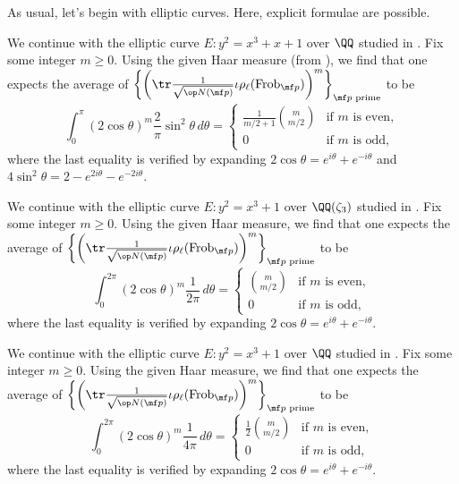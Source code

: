 \documentclass[../thesis.tex]{subfiles}
\begin{document}
As usual, let's begin with elliptic curves. Here, explicit formulae are possible.
\begin{example}
	We continue with the elliptic curve $E\colon y^2=x^3+x+1$ over $\QQ$ studied in . Fix some integer $m\ge0$. Using the given Haar measure (from ), we find that one expects the average of $\left\{\left(\tr\frac1{\sqrt{\op N(\mf p)}}\iota\rho_\ell(\mathrm{Frob}_{\mf p})\right)^m\right\}_{\mf p\text{ prime}}$ to be
	\[\int_0^\pi(2\cos\theta)^m\frac2\pi\sin^2\theta\,d\theta=\begin{cases}
		\frac1{m/2+1}\binom{m}{m/2} & \text{if }m\text{ is even}, \\
		0 & \text{if }m\text{ is odd},
	\end{cases}\]
	where the last equality is verified by expanding $2\cos\theta=e^{i\theta}+e^{-i\theta}$ and $4\sin^2\theta=2-e^{2i\theta}-e^{-2i\theta}$.
\end{example}
\begin{example}
	We continue with the elliptic curve $E\colon y^2=x^3+1$ over $\QQ(\zeta_3)$ studied in . Fix some integer $m\ge0$. Using the given Haar measure, we find that one expects the average of $\left\{\left(\tr\frac1{\sqrt{\op N(\mf p)}}\iota\rho_\ell(\mathrm{Frob}_{\mf p})\right)^m\right\}_{\mf p\text{ prime}}$ to be
	\[\int_0^{2\pi}(2\cos\theta)^m\frac1{2\pi}\,d\theta=\begin{cases}
		\binom{m}{m/2} & \text{if }m\text{ is even}, \\
		0 & \text{if }m\text{ is odd},
	\end{cases}\]
	where the last equality is verified by expanding $2\cos\theta=e^{i\theta}+e^{-i\theta}$.
\end{example}
\begin{example}
	We continue with the elliptic curve $E\colon y^2=x^3+1$ over $\QQ$ studied in . Fix some integer $m\ge0$. Using the given Haar measure, we find that one expects the average of $\left\{\left(\tr\frac1{\sqrt{\op N(\mf p)}}\iota\rho_\ell(\mathrm{Frob}_{\mf p})\right)^m\right\}_{\mf p\text{ prime}}$ to be
	\[\int_0^{2\pi}(2\cos\theta)^m\frac1{4\pi}\,d\theta=\begin{cases}
		\frac12\binom{m}{m/2} & \text{if }m\text{ is even}, \\
		0 & \text{if }m\text{ is odd},
	\end{cases}\]
	where the last equality is verified by expanding $2\cos\theta=e^{i\theta}+e^{-i\theta}$.
\end{example}
\end{document}
